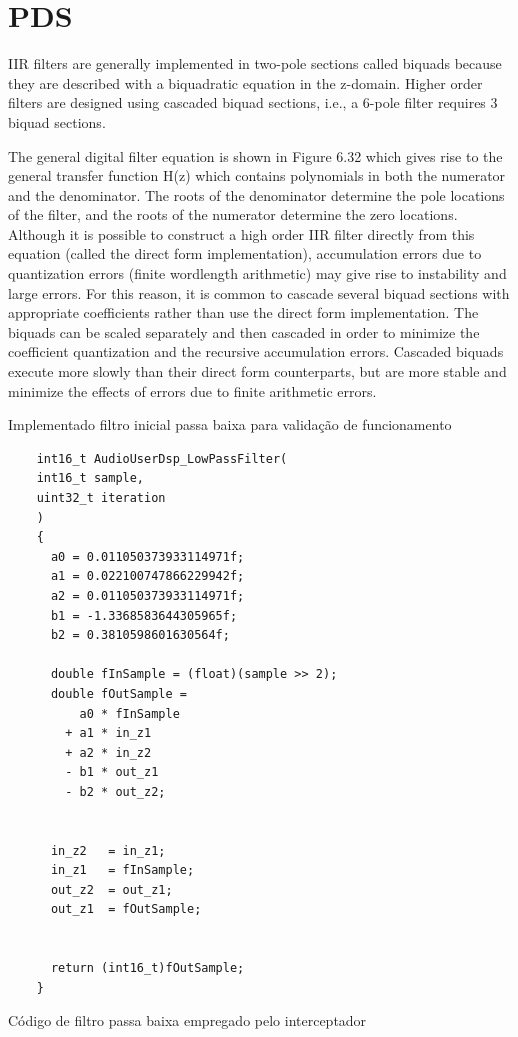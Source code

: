 \section{PDS}

\color{red}
IIR filters are generally implemented in two-pole sections called biquads because
they are described with a biquadratic equation in the z-domain. Higher order filters
are designed using cascaded biquad sections, i.e., a 6-pole filter requires 3 biquad
sections.

The general digital filter equation is shown in Figure 6.32 which gives rise to the
general transfer function H(z) which contains polynomials in both the numerator
and the denominator. The roots of the denominator determine the pole locations of
the filter, and the roots of the numerator determine the zero locations. Although it
is possible to construct a high order IIR filter directly from this equation (called the
direct form implementation), accumulation errors due to quantization errors (finite
wordlength arithmetic) may give rise to instability and large errors. For this reason,
it is common to cascade several biquad sections with appropriate coefficients rather
than use the direct form implementation. The biquads can be scaled separately and
then cascaded in order to minimize the coefficient quantization and the recursive
accumulation errors. Cascaded biquads execute more slowly than their direct form
counterparts, but are more stable and minimize the effects of errors due to finite
arithmetic errors.

\color{orange}

Implementado filtro inicial passa baixa para validação de funcionamento

\color{black}

\begin{sourcecode}[!ht]
\centering
\begin{verbatim}
    int16_t AudioUserDsp_LowPassFilter(
    int16_t sample, 
    uint32_t iteration
    )
    {
      a0 = 0.011050373933114971f;
      a1 = 0.022100747866229942f;
      a2 = 0.011050373933114971f;
      b1 = -1.3368583644305965f;
      b2 = 0.3810598601630564f;
    
      double fInSample = (float)(sample >> 2);
      double fOutSample = 
          a0 * fInSample 
        + a1 * in_z1 
        + a2 * in_z2
        - b1 * out_z1
        - b2 * out_z2;
    
    
      in_z2   = in_z1;
      in_z1   = fInSample;
      out_z2  = out_z1;
      out_z1  = fOutSample;
    
    
      return (int16_t)fOutSample;
    }

\end{verbatim}
\caption{Código de filtro passa baixa empregado pelo interceptador}\label{code:CML}
\end{sourcecode}

